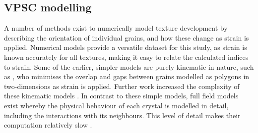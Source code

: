 \documentclass[a4paper,12pt,twoside]{report}
\numberwithin{equation}{chapter}
\begin{document}
\subsection{VPSC modelling}
%
%

A number of methods exist to numerically model texture development by describing the orientation of individual grains, and how these change as strain is applied. Numerical models provide a versatile dataset for this study, as strain is known accurately for all textures, making it easy to relate the calculated indices to strain. Some of the earlier, simpler models are purely kinematic in nature, such as \cite{Etchecopar1977}, who minimises the overlap and gaps between grains modelled as polygons in two-dimensions as strain is applied. Further work increased the complexity of these kinematic models \citep[e.g. using differential equations,][]{Ribe1989}. In contrast to these simple models, full field models \citep[e.g. finite element,][]{Sarma1996} exist whereby the physical behaviour of each crystal is modelled in detail, including the interactions with its neighbours. This level of detail makes their computation relatively slow \citep{Goulding2015}.
\end{document}
